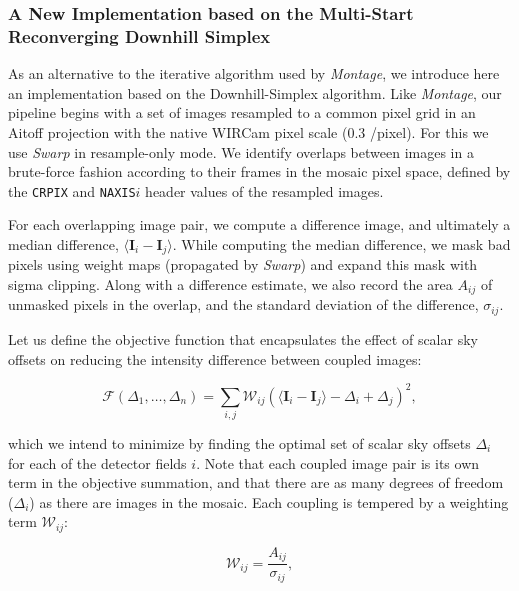 \documentclass[iop]{emulateapj}
\newcommand{\vect}[1]{\boldsymbol{#1}} %
\newcommand{\sw}[1]{\textit{#1}} %
\begin{document}
\subsubsection{A New Implementation based on the Multi-Start Reconverging Downhill Simplex}
\label{sec:msrnm_algo}

As an alternative to the iterative algorithm used by \sw{Montage}, we introduce here an implementation based on the \cite{Nelder:1965} Downhill-Simplex algorithm.
Like \sw{Montage}, our pipeline begins with a set of images resampled to a common pixel grid in an Aitoff projection with the native WIRCam pixel scale (0.3 \arcsec/pixel).
For this we use \sw{Swarp} \citep{Bertin:2002} in resample-only mode.
We identify overlaps between images in a brute-force fashion according to their frames in the mosaic pixel space, defined by the \texttt{CRPIX} and \texttt{NAXIS}$i$ header values of the resampled images.

For each overlapping image pair, we compute a difference image, and ultimately a median difference, $\langle \vect{I}_i - \vect{I}_j \rangle$.
While computing the median difference, we mask bad pixels using weight maps (propagated by \sw{Swarp}) and expand this mask with sigma clipping.
Along with a difference estimate, we also record the area $A_{ij}$ of unmasked pixels in the overlap, and the standard deviation of the difference, $\sigma_{ij}$.

Let us define the objective function that encapsulates the effect of scalar sky offsets on reducing the intensity difference between coupled images:

\begin{equation}
    \mathcal{F} \left(\Delta_1,\ldots,\Delta_n \right) = \sum_{i,j} \mathcal{W}_{ij} \left( \langle \vect{I}_i - \vect{I}_j \rangle - \Delta_i + \Delta_j \right)^2,
    \label{eq:objf}
\end{equation}

\noindent which we intend to minimize by finding the optimal set of scalar sky offsets $\Delta_i$ for each of the detector fields $i$.
Note that each coupled image pair is its own term in the objective summation, and that there are as many degrees of freedom ($\Delta_i$) as there are images in the mosaic.
Each coupling is tempered by a weighting term $\mathcal{W}_{ij}$:

\begin{equation}
    \mathcal{W}_{ij} = \frac{A_{ij}}{\sigma_{ij}},
\end{equation}
\end{document}
